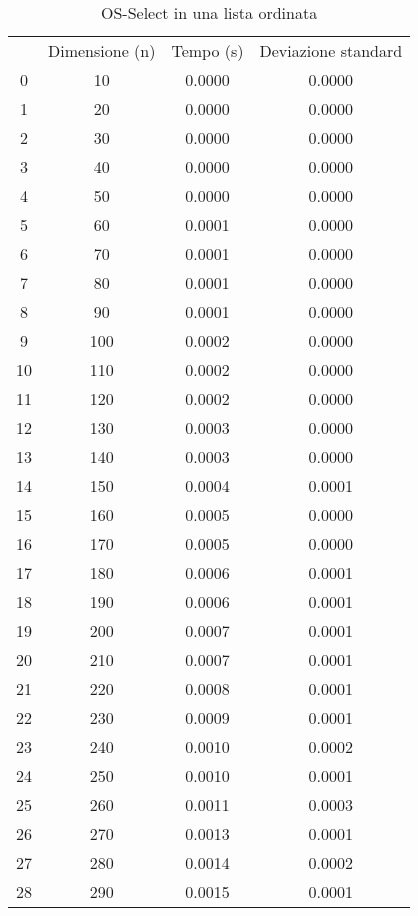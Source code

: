 \begin{table}[H]
\centering
\caption{OS-Select in una lista ordinata}
\label{OS-Select in una lista ordinata}
\begin{tabular}{cccc}
 & Dimensione (n) & Tempo (s) & Deviazione standard \\
0 & 10 & 0.0000 & 0.0000 \\
\cline{1-4}
1 & 20 & 0.0000 & 0.0000 \\
\cline{1-4}
2 & 30 & 0.0000 & 0.0000 \\
\cline{1-4}
3 & 40 & 0.0000 & 0.0000 \\
\cline{1-4}
4 & 50 & 0.0000 & 0.0000 \\
\cline{1-4}
5 & 60 & 0.0001 & 0.0000 \\
\cline{1-4}
6 & 70 & 0.0001 & 0.0000 \\
\cline{1-4}
7 & 80 & 0.0001 & 0.0000 \\
\cline{1-4}
8 & 90 & 0.0001 & 0.0000 \\
\cline{1-4}
9 & 100 & 0.0002 & 0.0000 \\
\cline{1-4}
10 & 110 & 0.0002 & 0.0000 \\
\cline{1-4}
11 & 120 & 0.0002 & 0.0000 \\
\cline{1-4}
12 & 130 & 0.0003 & 0.0000 \\
\cline{1-4}
13 & 140 & 0.0003 & 0.0000 \\
\cline{1-4}
14 & 150 & 0.0004 & 0.0001 \\
\cline{1-4}
15 & 160 & 0.0005 & 0.0000 \\
\cline{1-4}
16 & 170 & 0.0005 & 0.0000 \\
\cline{1-4}
17 & 180 & 0.0006 & 0.0001 \\
\cline{1-4}
18 & 190 & 0.0006 & 0.0001 \\
\cline{1-4}
19 & 200 & 0.0007 & 0.0001 \\
\cline{1-4}
20 & 210 & 0.0007 & 0.0001 \\
\cline{1-4}
21 & 220 & 0.0008 & 0.0001 \\
\cline{1-4}
22 & 230 & 0.0009 & 0.0001 \\
\cline{1-4}
23 & 240 & 0.0010 & 0.0002 \\
\cline{1-4}
24 & 250 & 0.0010 & 0.0001 \\
\cline{1-4}
25 & 260 & 0.0011 & 0.0003 \\
\cline{1-4}
26 & 270 & 0.0013 & 0.0001 \\
\cline{1-4}
27 & 280 & 0.0014 & 0.0002 \\
\cline{1-4}
28 & 290 & 0.0015 & 0.0001 \\

\end{tabular}
\end{table}
